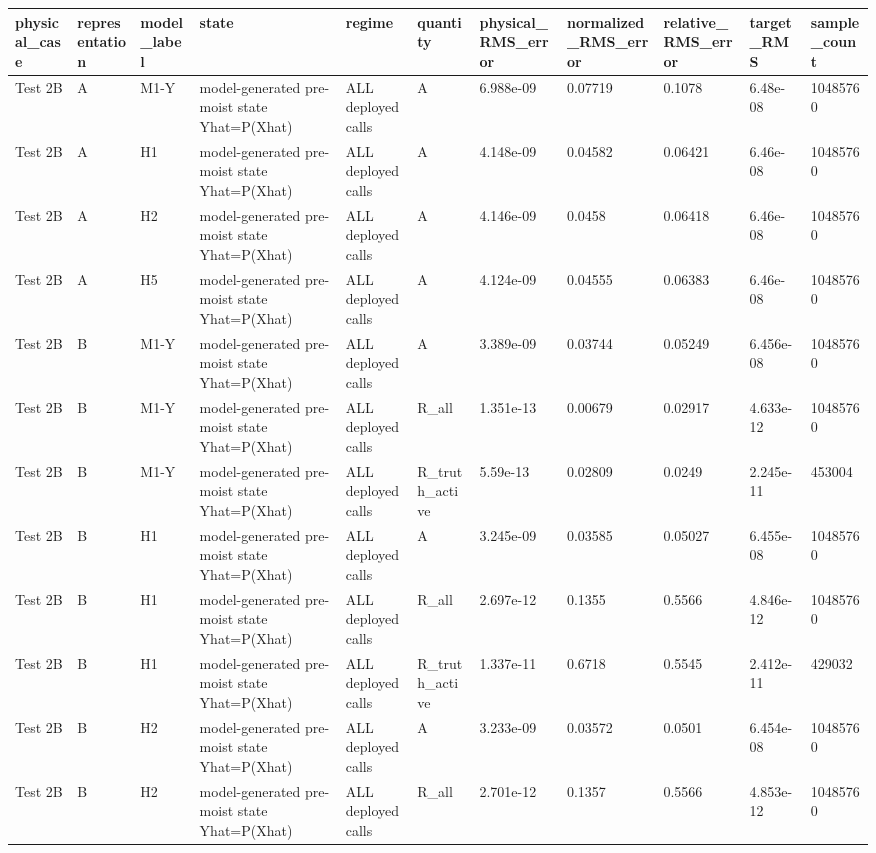 \begin{tabular}{lllllllllll}
\hline
physical\_case & representation & model\_label & state & regime & quantity & physical\_RMS\_error & normalized\_RMS\_error & relative\_RMS\_error & target\_RMS & sample\_count \\
\hline
Test 2B & A & M1-Y & model-generated pre-moist state Yhat=P(Xhat) & ALL deployed calls & A & 6.988e-09 & 0.07719 & 0.1078 & 6.48e-08 & 10485760 \\
Test 2B & A & H1 & model-generated pre-moist state Yhat=P(Xhat) & ALL deployed calls & A & 4.148e-09 & 0.04582 & 0.06421 & 6.46e-08 & 10485760 \\
Test 2B & A & H2 & model-generated pre-moist state Yhat=P(Xhat) & ALL deployed calls & A & 4.146e-09 & 0.0458 & 0.06418 & 6.46e-08 & 10485760 \\
Test 2B & A & H5 & model-generated pre-moist state Yhat=P(Xhat) & ALL deployed calls & A & 4.124e-09 & 0.04555 & 0.06383 & 6.46e-08 & 10485760 \\
Test 2B & B & M1-Y & model-generated pre-moist state Yhat=P(Xhat) & ALL deployed calls & A & 3.389e-09 & 0.03744 & 0.05249 & 6.456e-08 & 10485760 \\
Test 2B & B & M1-Y & model-generated pre-moist state Yhat=P(Xhat) & ALL deployed calls & R\_all & 1.351e-13 & 0.00679 & 0.02917 & 4.633e-12 & 10485760 \\
Test 2B & B & M1-Y & model-generated pre-moist state Yhat=P(Xhat) & ALL deployed calls & R\_truth\_active & 5.59e-13 & 0.02809 & 0.0249 & 2.245e-11 & 453004 \\
Test 2B & B & H1 & model-generated pre-moist state Yhat=P(Xhat) & ALL deployed calls & A & 3.245e-09 & 0.03585 & 0.05027 & 6.455e-08 & 10485760 \\
Test 2B & B & H1 & model-generated pre-moist state Yhat=P(Xhat) & ALL deployed calls & R\_all & 2.697e-12 & 0.1355 & 0.5566 & 4.846e-12 & 10485760 \\
Test 2B & B & H1 & model-generated pre-moist state Yhat=P(Xhat) & ALL deployed calls & R\_truth\_active & 1.337e-11 & 0.6718 & 0.5545 & 2.412e-11 & 429032 \\
Test 2B & B & H2 & model-generated pre-moist state Yhat=P(Xhat) & ALL deployed calls & A & 3.233e-09 & 0.03572 & 0.0501 & 6.454e-08 & 10485760 \\
Test 2B & B & H2 & model-generated pre-moist state Yhat=P(Xhat) & ALL deployed calls & R\_all & 2.701e-12 & 0.1357 & 0.5566 & 4.853e-12 & 10485760 \\

\end{tabular}
